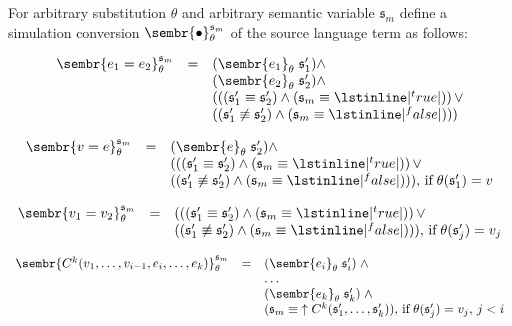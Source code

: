 \begin{definition}
\normalfont For arbitrary substitution $\theta$ and arbitrary semantic variable ${\mathfrak s}_m$ define a simulation
conversion $\sembr{\bullet}^{{\mathfrak s}_m}_\theta$ of the source language term as follows:

$$
\begin{array}{rcl}
\sembr{e_1 = e_2}^{{\mathfrak s}_m}_\theta&=& (\sembr{e_1}_\theta\; {\mathfrak s}^\prime_1) \wedge \\
                           & & (\sembr{e_2}_\theta\; {\mathfrak s}^\prime_2) \wedge \\
                           & & ((({\mathfrak s}^\prime_1 \equiv {\mathfrak s}^\prime_2) \wedge ({\mathfrak s}_m \equiv \lstinline|^true|))\, \vee \\ 
                           & & (({\mathfrak s}^\prime_1 \not \equiv {\mathfrak s}^\prime_2) \wedge ({\mathfrak s}_m \equiv \lstinline|^false|)))
\end{array}
$$

$$
\begin{array}{rcl}
\sembr{v = e}^{{\mathfrak s}_m}_\theta&=& (\sembr{e}_\theta\; {\mathfrak s}^\prime_2) \wedge \\
                        & & ((({\mathfrak s}^\prime_1 \equiv {\mathfrak s}^\prime_2) \wedge ({\mathfrak s}_m \equiv \lstinline|^true|))\, \vee \\ 
                        & & (({\mathfrak s}^\prime_1 \not \equiv {\mathfrak s}^\prime_2) \wedge ({\mathfrak s}_m \equiv \lstinline|^false|))),\,\mbox{if}\;\theta({\mathfrak s}^\prime_1)=v
\end{array}
$$

$$
\begin{array}{rcl}
\sembr{v_1 = v_2}^{{\mathfrak s}_m}_\theta&=& ((({\mathfrak s}^\prime_1 \equiv {\mathfrak s}^\prime_2) \wedge ({\mathfrak s}_m \equiv \lstinline|^true|))\, \vee \\ 
                           & & (({\mathfrak s}^\prime_1 \not \equiv {\mathfrak s}^\prime_2) \wedge ({\mathfrak s}_m \equiv \lstinline|^false|))),\,\mbox{if}\;\theta({\mathfrak s}^\prime_j)=v_j
\end{array}
$$

$$ 
\begin{array}{rcl}
\sembr{C^k(v_1, \ldots, v_{i-1}, e_i, \ldots, e_k)}^{{\mathfrak s}_m}_\theta&=&(\sembr{e_i}_\theta \; {\mathfrak s}^\prime_i) \; \wedge \\
       & & \ldots  \\
       & & (\sembr{e_k}_\theta \; {\mathfrak s}^\prime_k) \; \wedge \\
       & & ({\mathfrak s}_m \equiv\; \uparrow C^k({\mathfrak s}^\prime_1, \ldots, {\mathfrak s}^\prime_k)),\,\mbox{if}\;\theta({\mathfrak s}^\prime_j)=v_j,\,j<i
\end{array}
$$


\end{definition}

